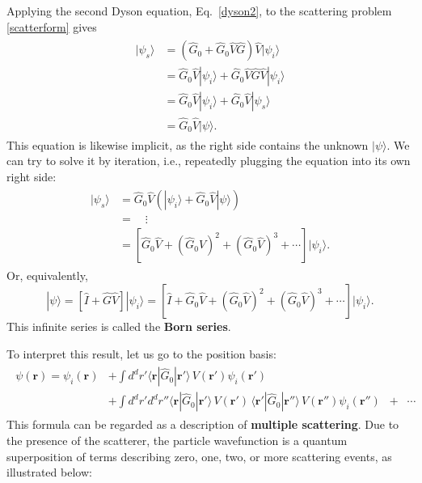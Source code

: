 \documentclass[pra,12pt]{revtex4-2}
\begin{document}
Applying the second Dyson equation, Eq.~\eqref{dyson2}, to the
scattering problem \eqref{scatterform} gives
\begin{align}
  \begin{aligned}|\psi_s\rangle &= \left(\hat{G}_0 + \hat{G}_0\hat{V}\hat{G}\right) \hat{V} |\psi_i\rangle \\ &= \hat{G}_0 \hat{V} |\psi_i\rangle + \hat{G}_0\hat{V}\hat{G} \hat{V} |\psi_i\rangle \\ &= \hat{G}_0 \hat{V} |\psi_i\rangle + \hat{G}_0\hat{V} |\psi_s\rangle \\ &= \hat{G}_0\hat{V} |\psi\rangle.\end{aligned}
  \label{psis_implicity}
\end{align}
This equation is likewise implicit, as the right side contains the
unknown $|\psi\rangle$.  We can try to solve it by iteration, i.e.,
repeatedly plugging the equation into its own right side:
\begin{align}
  \begin{aligned}|\psi_s\rangle &= \hat{G}_0 \hat{V} \left(|\psi_i\rangle + \hat{G}_0 \hat{V}|\psi\rangle\right) \\ &= \quad \vdots \\ &= \left[\hat{G}_0 \hat{V} + (\hat{G}_0 \hat{V})^2 + (\hat{G}_0 \hat{V})^3 + \cdots\right]|\psi_i\rangle.\end{aligned}
\end{align}
Or, equivalently,
\begin{equation}
  |\psi\rangle
  = \left[\hat{I} + \hat{G} \hat{V}\right] |\psi_i\rangle
  = \left[\hat{I} + \hat{G}_0 \hat{V} + (\hat{G}_0 \hat{V})^2 + (\hat{G}_0 \hat{V})^3 + \cdots\right]|\psi_i\rangle.
  \label{bornseries}
\end{equation}
This infinite series is called the \textbf{Born series}.

To interpret this result, let us go to the position basis:
\begin{align}
  \begin{aligned}\psi(\mathbf{r}) = \psi_i(\mathbf{r}) &+ \int d^dr' \langle \mathbf{r} | \hat{G}_0 |\mathbf{r}'\rangle\, V(\mathbf{r}') \psi_i(\mathbf{r}') \\ &+ \int d^dr' d^dr'' \langle \mathbf{r} | \hat{G}_0 |\mathbf{r}'\rangle\, V(\mathbf{r}') \, \langle \mathbf{r}' | \hat{G}_0 |\mathbf{r}''\rangle \, V(\mathbf{r}'') \psi_i(\mathbf{r}'') \;\; + \;\;\cdots\end{aligned}
    \label{Bornposition}
\end{align}
This formula can be regarded as a description of \textbf{multiple
  scattering}.  Due to the presence of the scatterer, the particle
wavefunction is a quantum superposition of terms describing zero, one,
two, or more scattering events, as illustrated below:
\end{document}
